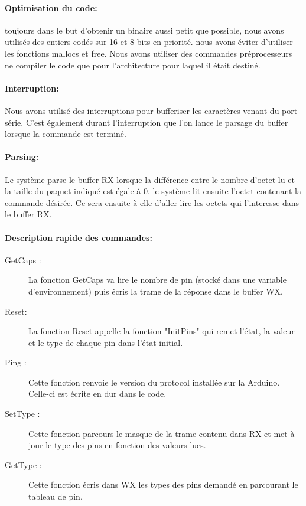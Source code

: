 \paragraph{Optimisation du code:}
toujours dans le but d'obtenir un binaire aussi petit que possible,
nous avons utilisés des entiers codés sur 16 et 8 bits en
priorité. nous avons éviter d'utiliser les fonctions mallocs et
free. Nous avons utiliser des commandes préprocesseurs ne compiler 
le code que pour l'architecture pour laquel il était destiné.

\paragraph{Interruption:}
Nous avons utilisé des interruptions pour bufferiser les caractères
venant du port série. C'est également durant l'interruption que l'on
lance le parsage du buffer lorsque la commande est terminé.


\paragraph{Parsing:} 

Le système parse le buffer RX lorsque la différence entre le nombre
d'octet lu et la taille du paquet indiqué est égale à 0. le système
lit ensuite l'octet contenant la commande désirée. Ce sera ensuite à
elle d'aller lire les octets qui l'interesse dans le buffer RX.

\paragraph{Description rapide des commandes:}

\begin{description}
\item[GetCaps :] La fonction GetCaps va lire le nombre de pin (stocké dans une variable d'environnement) puis écris la trame de la réponse dans le buffer WX.
\item[Reset:] La fonction Reset appelle la fonction "InitPins" qui remet l'état, la valeur et le type de chaque pin dans l'état initial.
\item[Ping :] Cette fonction renvoie le version du protocol installée sur la Arduino. Celle-ci est écrite en dur dans le code.
\item[SetType :] Cette fonction parcours le masque de la trame contenu dans RX et met à jour le type des pins en fonction des valeurs lues.
\item[GetType :] Cette fonction écris dans WX les types des pins demandé en parcourant le tableau de pin.
\end{description}

